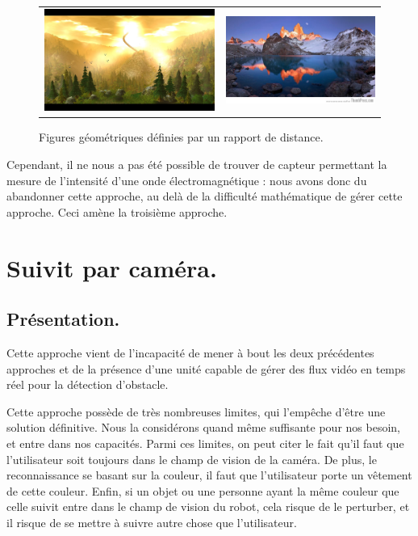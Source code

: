\begin{figure}
    \label{follow_conf}
    \begin{center}
        \begin{tabular}{cc}
            \includegraphics[width=0.4\linewidth]{rcs/follow1.png} & \includegraphics[width=0.4\linewidth]{rcs/follow2.png}
        \end{tabular}
    \end{center}
    \caption{Figures géométriques définies par un rapport de distance.}
\end{figure}

Cependant, il ne nous a pas été possible de trouver de capteur permettant la mesure de l'intensité d'une onde électromagnétique : nous avons donc du abandonner cette approche, au delà de la difficulté mathématique de gérer cette approche. Ceci amène la troisième approche.

\section{Suivit par caméra.}
\subsection{Présentation.}
Cette approche vient de l'incapacité de mener à bout les deux précédentes approches et de la présence d'une unité capable de gérer des flux vidéo en temps réel pour la détection d'obstacle.

Cette approche possède de très nombreuses limites, qui l'empêche d'être une solution définitive. Nous la considérons quand même suffisante pour nos besoin, et entre dans nos capacités. Parmi ces limites, on peut citer le fait qu'il faut que l'utilisateur soit toujours dans le champ de vision de la caméra. De plus, le reconnaissance se basant sur la couleur, il faut que l'utilisateur porte un vêtement de cette couleur. Enfin, si un objet ou une personne ayant la même couleur que celle suivit entre dans le champ de vision du robot, cela risque de le perturber, et il risque de se mettre à suivre autre chose que l'utilisateur.

